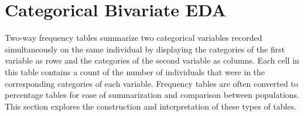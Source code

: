 \documentclass[10pt,openany]{book}\usepackage[]{graphicx}\usepackage[]{color}
\begin{document}
\section{Categorical Bivariate EDA}   \label{sect:BEDACategorical}
Two-way frequency tables summarize two categorical variables recorded simultaneously on the same individual by displaying the categories of the first variable as rows and the categories of the second variable as columns.  Each cell in this table contains a count of the number of individuals that were in the corresponding categories of each variable.  Frequency tables are often converted to percentage tables for ease of summarization and comparison between populations.  This section explores the construction and interpretation of these types of tables.
\end{document}
